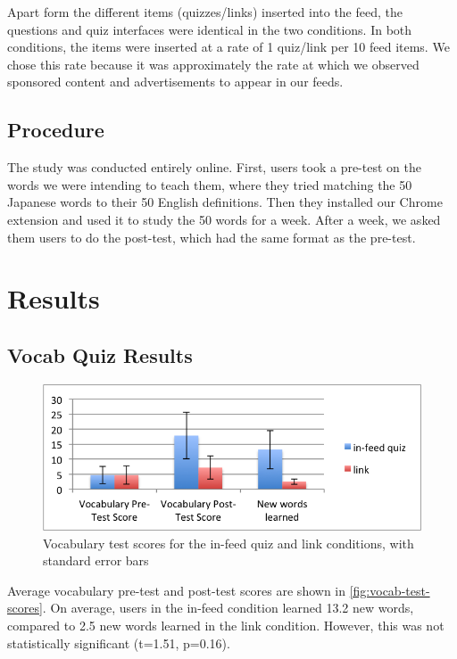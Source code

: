 \documentclass{sigchi}
\begin{document}
Apart form the different items (quizzes/links) inserted into the feed, the questions and quiz interfaces were identical in the two conditions. In both conditions, the items were inserted at a rate of 1 quiz/link per 10 feed items. We chose this rate because it was approximately the rate at which we observed sponsored content and advertisements to appear in our feeds.


\subsection{Procedure}

The study was conducted entirely online. First, users took a pre-test on the words we were intending to teach them, where they tried matching the 50 Japanese words to their 50 English definitions. Then they installed our Chrome extension and used it to study the 50 words for a week. After a week, we asked them users to do the post-test, which had the same format as the pre-test.

\section{Results}

\subsection{Vocab Quiz Results}

\begin{figure}
\centering
\includegraphics[width=1.0\columnwidth]{vocab-test-scores}
\caption{Vocabulary test scores for the in-feed quiz and link conditions, with standard error bars}
\label{fig:vocab-test-scores}
\end{figure}

Average vocabulary pre-test and post-test scores are shown in \autoref{fig:vocab-test-scores}. On average, users in the in-feed condition learned 13.2 new words, compared to 2.5 new words learned in the link condition. However, this was not statistically significant (t=1.51, p=0.16).
\end{document}

